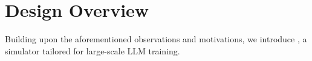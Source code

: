 

\section{Design Overview} 
\label{sec:overview} 

\noindent Building upon the aforementioned observations and motivations, 
we introduce \sys, a simulator tailored for large-scale LLM training.

